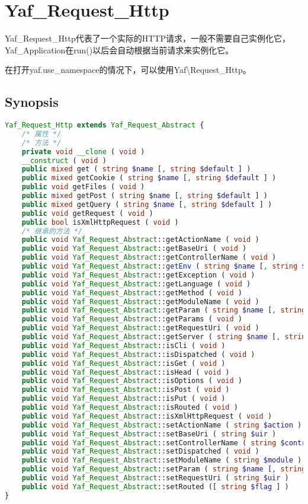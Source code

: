 \chapter{Yaf\_Request\_Http}

Yaf\_Request\_Http代表了一个实际的HTTP请求，一般不需要自己实例化它，Yaf\_Application在run()以后会自动根据当前请求来实例化它。

在打开yaf.use\_namespace的情况下，可以使用Yaf\textbackslash Request\_Http。

\section{Synopsis}


\begin{lstlisting}[language=PHP]
Yaf_Request_Http extends Yaf_Request_Abstract {
    /* 属性 */
    /* 方法 */
    private void __clone ( void )
    __construct ( void )
    public mixed get ( string $name [, string $default ] )
    public mixed getCookie ( string $name [, string $default ] )
    public void getFiles ( void )
    public mixed getPost ( string $name [, string $default ] )
    public mixed getQuery ( string $name [, string $default ] )
    public void getRequest ( void )
    public bool isXmlHttpRequest ( void )
    /* 继承的方法 */
    public void Yaf_Request_Abstract::getActionName ( void )
    public void Yaf_Request_Abstract::getBaseUri ( void )
    public void Yaf_Request_Abstract::getControllerName ( void )
    public void Yaf_Request_Abstract::getEnv ( string $name [, string $default ] )
    public void Yaf_Request_Abstract::getException ( void )
    public void Yaf_Request_Abstract::getLanguage ( void )
    public void Yaf_Request_Abstract::getMethod ( void )
    public void Yaf_Request_Abstract::getModuleName ( void )
    public void Yaf_Request_Abstract::getParam ( string $name [, string $default ] )
    public void Yaf_Request_Abstract::getParams ( void )
    public void Yaf_Request_Abstract::getRequestUri ( void )
    public void Yaf_Request_Abstract::getServer ( string $name [, string $default ] )
    public void Yaf_Request_Abstract::isCli ( void )
    public void Yaf_Request_Abstract::isDispatched ( void )
    public void Yaf_Request_Abstract::isGet ( void )
    public void Yaf_Request_Abstract::isHead ( void )
    public void Yaf_Request_Abstract::isOptions ( void )
    public void Yaf_Request_Abstract::isPost ( void )
    public void Yaf_Request_Abstract::isPut ( void )
    public void Yaf_Request_Abstract::isRouted ( void )
    public void Yaf_Request_Abstract::isXmlHttpRequest ( void )
    public void Yaf_Request_Abstract::setActionName ( string $action )
    public void Yaf_Request_Abstract::setBaseUri ( string $uir )
    public void Yaf_Request_Abstract::setControllerName ( string $controller )
    public void Yaf_Request_Abstract::setDispatched ( void )
    public void Yaf_Request_Abstract::setModuleName ( string $module )
    public void Yaf_Request_Abstract::setParam ( string $name [, string $value ] )
    public void Yaf_Request_Abstract::setRequestUri ( string $uir )
    public void Yaf_Request_Abstract::setRouted ([ string $flag ] )
}
\end{lstlisting}

